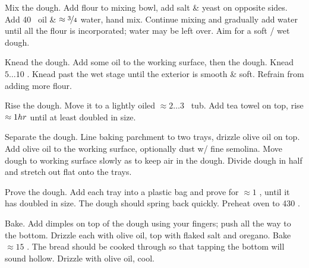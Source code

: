 \begin{preparation}
\item Mix the dough.
	Add flour to mixing bowl, add salt \& yeast on opposite sides.
	Add 40 \milliliter~oil \& $\approx\threefourth$ water, hand mix.
	Continue mixing and gradually add water until all the flour is incorporated; water may be left over.
	Aim for a soft / wet dough.

\item Knead the dough.
	Add some oil to the working surface, then the dough.
	Knead $5 \dots 10$ \minute.
	Knead past the wet stage until the exterior is smooth \& soft.
	Refrain from adding more flour.

\item Rise the dough.
	Move it to a lightly oiled $\approx 2 \dots 3$ \quart~tub.
	Add tea towel on top, rise $\approx 1 \hour$ until at least doubled in size.

\item Separate the dough.
	Line baking parchment to two trays, drizzle olive oil on top.
	Add olive oil to the working surface, optionally dust w/ fine semolina.
	Move dough to working surface slowly as to keep air in the dough.
	Divide dough in half and stretch out flat onto the trays.

\item Prove the dough.
	Add each tray into a plastic bag and prove for $\approx 1$ \hour, until it has doubled in size.
	The dough should spring back quickly.
	Preheat oven to 430 \Fahrenheit.

\item Bake.
	Add dimples on top of the dough using your fingers; push all the way to the bottom.
	Drizzle each with olive oil, top with flaked salt and oregano.
	Bake $\approx 15$ \minute.
	The bread should be cooked through so that tapping the bottom will sound hollow.
	Drizzle with olive oil, cool.
\end{preparation}


\recipeend%
